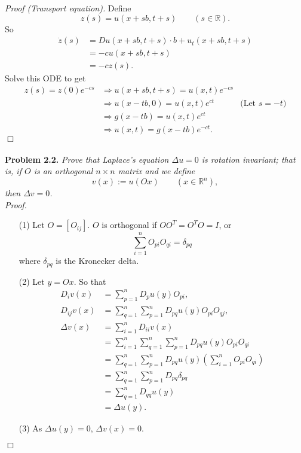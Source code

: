 \documentclass{article}
\begin{document}
\emph{Proof (Transport equation).}
Define
\[
  z(s) = u(x+sb,t+s) \qquad (s \in \mathbb{R}).
\]
So
\begin{align*}
  \dot{z}(s)
  &= Du(x+sb,t+s) \cdot b + u_t(x+sb,t+s) \\
  &= -cu(x+sb,t+s) \\
  &= -cz(s).
\end{align*}
Solve this ODE to get
\begin{align*}
  z(s) = z(0) e^{-cs}
  &\Longrightarrow
  u(x+sb,t+s) = u(x,t) e^{-cs} \\
  &\Longrightarrow
  u(x-tb,0) = u(x,t) e^{ct}
    &\text{(Let $s = -t$)} \\
  &\Longrightarrow
  g(x-tb) = u(x,t) e^{ct} \\
  &\Longrightarrow
  u(x,t) = g(x-tb) e^{-ct}.
\end{align*}
$\Box$ \\\\






\textbf{Problem 2.2.}
\emph{Prove that Laplace's equation $\Delta u = 0$ is rotation invariant;
that is, if $O$ is an orthogonal $n \times n$ matrix and we define
\[
  v(x) := u(Ox) \qquad (x \in \mathbb{R}^n),
\]
then $\Delta v = 0$.} \\

\emph{Proof.}
\begin{enumerate}
\item[(1)]
  Let $O = [O_{ij}]$.
  $O$ is orthogonal if $OO^{T} = O^{T}O = I$,
  or
  \[
    \sum_{i=1}^{n} O_{pi} O_{qi} = \delta_{pq}
  \]
  where $\delta_{pq}$ is the Kronecker delta.

\item[(2)]
  Let $y = Ox$.
  So that
  \begin{align*}
    D_i v(x)
    &= \sum_{p=1}^{n} D_p u(y) O_{pi}, \\
    D_{ij} v(x)
    &= \sum_{q=1}^{n} \sum_{p=1}^{n} D_{pq}u(y) O_{pi} O_{qj}, \\
    \Delta v(x)
    &= \sum_{i=1}^{n} D_{ii} v(x) \\
    &= \sum_{i=1}^{n} \sum_{q=1}^{n}\sum_{p=1}^{n} D_{pq}u(y) O_{pi} O_{qi} \\
    &= \sum_{q=1}^{n} \sum_{p=1}^{n} D_{pq} u(y) \left( \sum_{i=1}^{n} O_{pi} O_{qi} \right) \\
    &= \sum_{q=1}^{n} \sum_{p=1}^{n} D_{pq} \delta_{pq} \\
    &= \sum_{q=1}^{n} D_{qq}u(y) \\
    &= \Delta u(y).
  \end{align*}

\item[(3)]
  As $\Delta u(y) = 0$, $\Delta v(x) = 0$.
\end{enumerate}
$\Box$ \\\\
\end{document}
